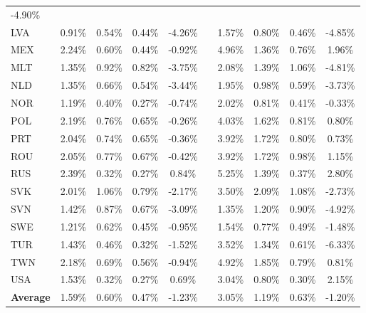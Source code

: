 \documentclass{article}
\begin{document}
\begin{table}
\begin{tabular}{lccccccccc}
-4.90\% \\LVA & 0.91\% & 0.54\% & 0.44\% &-4.26\% &&1.57\% & 0.80\% & 0.46\% & -4.85\% \\MEX & 2.24\% & 0.60\% & 0.44\% &-0.92\% &&4.96\% & 1.36\% & 0.76\% & 1.96\% \\MLT & 1.35\% & 0.92\% & 0.82\% &-3.75\% &&2.08\% & 1.39\% & 1.06\% & -4.81\% \\NLD & 1.35\% & 0.66\% & 0.54\% &-3.44\% &&1.95\% & 0.98\% & 0.59\% & -3.73\% \\NOR & 1.19\% & 0.40\% & 0.27\% &-0.74\% &&2.02\% & 0.81\% & 0.41\% & -0.33\% \\POL & 2.19\% & 0.76\% & 0.65\% &-0.26\% &&4.03\% & 1.62\% & 0.81\% & 0.80\% \\PRT & 2.04\% & 0.74\% & 0.65\% &-0.36\% &&3.92\% & 1.72\% & 0.80\% & 0.73\% \\ROU & 2.05\% & 0.77\% & 0.67\% &-0.42\% &&3.92\% & 1.72\% & 0.98\% & 1.15\% \\RUS & 2.39\% & 0.32\% & 0.27\% &0.84\% &&5.25\% & 1.39\% & 0.37\% & 2.80\% \\SVK & 2.01\% & 1.06\% & 0.79\% &-2.17\% &&3.50\% & 2.09\% & 1.08\% & -2.73\% \\SVN & 1.42\% & 0.87\% & 0.67\% &-3.09\% &&1.35\% & 1.20\% & 0.90\% & -4.92\% \\SWE & 1.21\% & 0.62\% & 0.45\% &-0.95\% &&1.54\% & 0.77\% & 0.49\% & -1.48\% \\TUR & 1.43\% & 0.46\% & 0.32\% &-1.52\% &&3.52\% & 1.34\% & 0.61\% & -6.33\% \\TWN & 2.18\% & 0.69\% & 0.56\% &-0.94\% &&4.92\% & 1.85\% & 0.79\% & 0.81\% \\USA & 1.53\% & 0.32\% & 0.27\% &0.69\% &&3.04\% & 0.80\% & 0.30\% & 2.15\% \\ \addlinespace[3pt]
\textbf{Average} & 1.59\% & 0.60\% & 0.47\% & -1.23\% && 3.05\% & 1.19\% & 0.63\% & -1.20\% \\ \bottomrule
\end{tabular}

\end{table}
\end{document}
